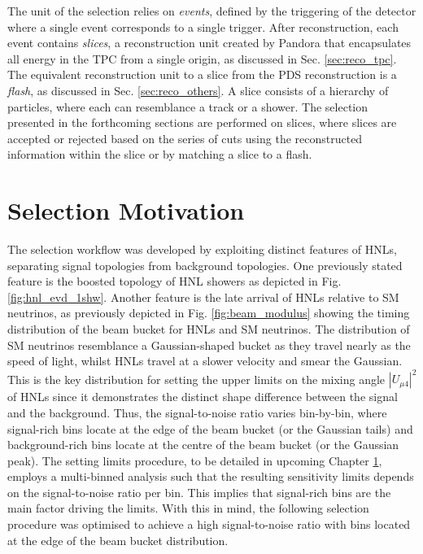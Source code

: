 The unit of the selection relies on \textit{events}, defined by the triggering of the detector where a single event corresponds to a single trigger.
After reconstruction, each event contains \textit{slices}, a reconstruction unit created by Pandora that encapsulates all energy in the TPC from a single origin, as discussed in Sec. \ref{sec:reco_tpc}.
The equivalent reconstruction unit to a slice from the PDS reconstruction is a \textit{flash}, as discussed in Sec. \ref{sec:reco_others}.
A slice consists of a hierarchy of particles, where each can resemblance a track or a shower.
The selection presented in the forthcoming sections are performed on slices, where slices are accepted or rejected based on the series of cuts using the reconstructed information within the slice or by matching a slice to a flash.


\section{Selection Motivation}

The selection workflow was developed by exploiting distinct features of HNLs, separating signal topologies from background topologies.
One previously stated feature is the boosted topology of HNL showers as depicted in Fig. \ref{fig:hnl_evd_1shw}.
Another feature is the late arrival of HNLs relative to SM neutrinos, as previously depicted in Fig. \ref{fig:beam_modulus} showing the timing distribution of the beam bucket for HNLs and SM neutrinos.
The distribution of SM neutrinos resemblance a Gaussian-shaped bucket as they travel nearly as the speed of light, whilst HNLs travel at a slower velocity and smear the Gaussian.
This is the key distribution for setting the upper limits on the mixing angle $|U_{\mu4}|^2$ of HNLs since it demonstrates the distinct shape difference between the signal and the background.
Thus, the signal-to-noise ratio varies bin-by-bin, where signal-rich bins locate at the edge of the beam bucket (or the Gaussian tails) and background-rich bins locate at the centre of the beam bucket (or the Gaussian peak).
The setting limits procedure, to be detailed in upcoming Chapter \ref{}, employs a multi-binned analysis such that the resulting sensitivity limits depends on the signal-to-noise ratio per bin.
This implies that signal-rich bins are the main factor driving the limits.
With this in mind, the following selection procedure was optimised to achieve a high signal-to-noise ratio with bins located at the edge of the beam bucket distribution.

